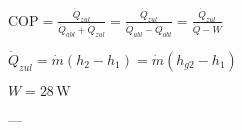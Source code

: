 \( \text{COP} = \frac{\dot{Q}_{zul}}{\dot{Q}_{abl} + \dot{Q}_{zul}} = \frac{\dot{Q}_{zul}}{\dot{Q}_{abl} - \dot{Q}_{abl}} = \frac{\dot{Q}_{zul}}{\dot{Q} - W} \)  

\( \dot{Q}_{zul} = \dot{m} (h_2 - h_1) = \dot{m} (h_{g2} - h_1) \)  

\( W = 28 \, \text{W} \)  

---